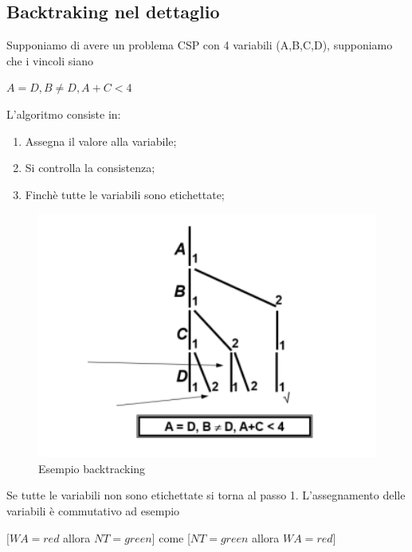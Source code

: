 \subsection{Backtraking nel dettaglio}
Supponiamo di avere un problema CSP con 4 variabili (A,B,C,D), supponiamo che i vincoli siano
\begin{center}
    $A = D, B \neq D, A + C < 4$
\end{center}
L’algoritmo consiste in:
\begin{enumerate}
    \item Assegna il valore alla variabile;
    \item Si controlla la consistenza;
    \item Finchè tutte le variabili sono etichettate;
\end{enumerate}
\begin{figure}[htp]
	\centering
    \includegraphics[width=13cm, keepaspectratio]{img/Cap2/back1.png}
    \caption{Esempio backtracking}
\end{figure}
Se tutte le variabili non sono etichettate si torna al passo 1. L’assegnamento delle variabili è commutativo ad esempio
\begin{center}
    $[WA = red$ allora $NT = green]$ come [$NT=green$ allora $WA =red]$
\end{center}


